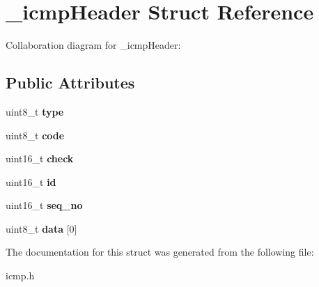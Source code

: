 \hypertarget{struct__icmpHeader}{}\section{\+\_\+icmp\+Header Struct Reference}
\label{struct__icmpHeader}


Collaboration diagram for \+\_\+icmp\+Header\+:
\subsection*{Public Attributes}
\begin{DoxyCompactItemize}
\item 
\mbox{\label{struct__icmpHeader_ac5cb21998813ca6fba404cd504fbada0}} 
uint8\+\_\+t {\bfseries type}
\item 
\mbox{\label{struct__icmpHeader_a143f787e775af41d31936c1ced3f569c}} 
uint8\+\_\+t {\bfseries code}
\item 
\mbox{\label{struct__icmpHeader_af2ca43ba9768757f4d04006a2d03fcc5}} 
uint16\+\_\+t {\bfseries check}
\item 
\mbox{\label{struct__icmpHeader_a3f07c14263b87401727edf31865bd15c}} 
uint16\+\_\+t {\bfseries id}
\item 
\mbox{\label{struct__icmpHeader_af8216680fadf3c4ae5f989de1d3babf0}} 
uint16\+\_\+t {\bfseries seq\+\_\+no}
\item 
\mbox{\label{struct__icmpHeader_a6e63c5802b87f37b0f686e16934048e5}} 
uint8\+\_\+t {\bfseries data} \mbox{[}0\mbox{]}
\end{DoxyCompactItemize}


The documentation for this struct was generated from the following file\+:\begin{DoxyCompactItemize}
\item 
icmp.\+h\end{DoxyCompactItemize}
